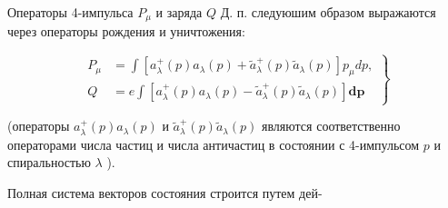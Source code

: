 \documentclass[10pt]{article}
\begin{document}
Операторы 4-импульса $P_{\mu}$ и заряда $Q$ Д. п. следуюшим образом выражаются через операторы рождения и уничтожения:



\[

\left.\begin{array}{rl}

P_{\mu} & =\int\left[a_{\lambda}^{+}(p) a_{\lambda}(p)+\tilde{a}_{\lambda}^{+}(p) \tilde{a}_{\lambda}(p)\right] p_{\mu} d p, \\

Q & =e \int\left[a_{\lambda}^{+}(p) a_{\lambda}(p)-\tilde{a}_{\lambda}^{+}(p) \tilde{a}_{\lambda}(p)\right] \boldsymbol{d p}

\end{array}\right\}

\]



(операторы $a_{\lambda}^{+}(p) a_{\lambda}(p)$ и $\tilde{a}_{\lambda}^{+}(p) \tilde{a}_{\lambda}(p)$ являются соответственно операторами числа частиц и числа античастиц в состоянии с 4-импульсом $p$ и спиральностью $\lambda$ ).



Полная система векторов состояния строится путем дей-
\end{document}
